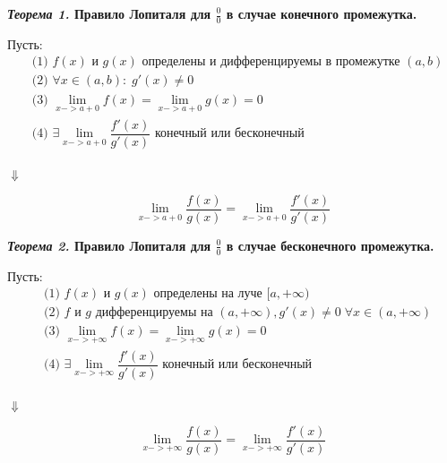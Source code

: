 \documentclass[a4paper,12pt]{article}
\theoremstyle{plain} %
\theoremstyle{definition} %
\theoremstyle{remark} %
\begin{document}
\textbf{\textit{Теорема 1.} Правило Лопиталя для $\frac{0}{0}$ в случае конечного промежутка.}

Пусть:
\begin{equation*}
	\begin{aligned}
		 & \text{(1) } f(x) \text{ и } g(x) \text{ определены и дифференцируемы в промежутке }(a, b)    \\
		 & \text{(2) } \forall x \in (a, b): \; g'(x) \neq 0                                            \\
		 & \text{(3) }  \lim_{x-> a + 0} f(x) =  \lim_{x-> a + 0} g(x) = 0                              \\
		 & \text{(4) }  \exists \lim_{x-> a + 0} \dfrac{f'(x)}{g'(x)} \text{ конечный или бесконечный } \\
	\end{aligned}
\end{equation*}

\begin{center}
	$\Downarrow$
\end{center}

\[\lim_{x-> a + 0} \dfrac{f(x)}{g(x)} =\lim_{x-> a + 0} \dfrac{f'(x)}{g'(x)} \]



\textbf{\textit{Теорема 2.} Правило Лопиталя для $\frac{0}{0}$ в случае бесконечного промежутка.}

Пусть:
\begin{equation*}
	\begin{aligned}
		 & \text{(1) } f(x) \text{ и } g(x) \text{ определены на луче }[a, +\infty)                                        \\
		 & \text{(2) } f \text{ и } g \text{ дифференцируемы на } (a, +\infty), g'(x) \neq 0 \; \forall x \in (a, +\infty) \\
		 & \text{(3) }  \lim_{x-> +\infty} f(x) =  \lim_{x-> +\infty} g(x) = 0                                             \\
		 & \text{(4) }  \exists \lim_{x-> +\infty} \dfrac{f'(x)}{g'(x)} \text{ конечный или бесконечный }                  \\
	\end{aligned}
\end{equation*}

\begin{center}
	$\Downarrow$
\end{center}

\[\lim_{x-> +\infty} \dfrac{f(x)}{g(x)} =\lim_{x->+\infty } \dfrac{f'(x)}{g'(x)} \]
\end{document}
